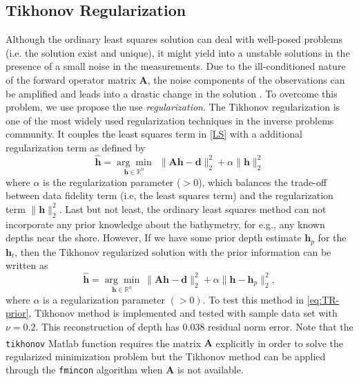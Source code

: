 \subsection{ Tikhonov Regularization}\label{TikRegMethod}

Although the ordinary least squares solution can deal with well-posed problems (i.e. the solution exist and unique), it might yield into a unstable solutions in the presence of a small noise in the measurements. Due to the ill-conditioned nature of the forward operator matrix $\mathbf{A}$, the noise components of the observations can be amplified and leads into a drastic change in the solution \cite{Tuys2014}. To overcome this problem, we use propose the use \textit{regularization}. The Tikhonov regularization is one of the most widely used regularization techniques in the inverse problems community. It couples the least squares term in \eqref{LS} with a additional regularization term as defined by 
\begin{equation}\label{eq:TR}
\mathbf{\hat{h}} = \underset{\mathbf{h} \in \mathbb{R}^n}{\arg \min} \ \ \|  \mathbf{A}\mathbf{h} -  \mathbf{d} \|_2^2  +  \alpha \| \mathbf{h}\|_2^2
\end{equation}
where $\alpha$ is the regularization parameter ($>0$), which balances the trade-off between data fidelity term (i.e, the least squares term) and the regularization term $\| \mathbf{h}\|_2^2$. %
Last but not least, the ordinary least squares method can not incorporate any prior knowledge about the bathymetry, for e.g., any known depths near the shore. However, If we have  some prior depth estimate $\mathbf{h}_p$ for the $\mathbf{h}_t$, then the Tikhonov regularized solution with the prior information can be written as
\begin{equation}\label{eq:TR-prior}
\mathbf{\hat{h}} = \underset{\mathbf{h} \in \mathbb{R}^n}{\arg \min} \  \|  \mathbf{A}\mathbf{h} -  \mathbf{d} \|_2^2  +  \alpha \| \mathbf{h} -  \mathbf{h}_p\|_2^2,
\end{equation}
where $\alpha$ is a regularization parameter $(>0)$. To test this method in \eqref{eq:TR-prior}, Tikhonov method is implemented and tested with sample data set with $\nu = 0.2$. This reconstruction of depth has 0.038 residual norm error. Note that the \verb|tikhonov| Matlab\textsuperscript{\textregistered} function requires the matrix $\mathbf{A}$ explicitly in order to solve the regularized minimization problem but the Tikhonov method can be applied through the \verb|fmincon| algorithm when $\mathbf{A}$ is not available. 

